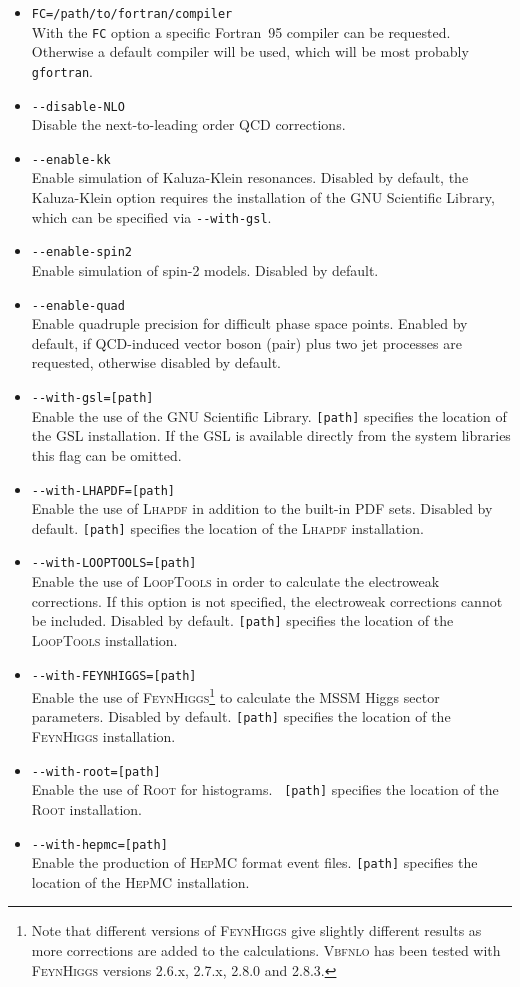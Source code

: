 \documentclass[english,12pt]{article}
\begin{document}
\begin{itemize}
\item {\tt FC=/path/to/fortran/compiler} \\ With the {\tt FC} option a specific {\sc Fortran}~95 compiler
      can be requested. Otherwise a default compiler will be used, which will be most probably {\tt gfortran}.
\item {\tt -{}-disable-NLO} \\ Disable the next-to-leading order QCD
corrections.  
\item {\tt -{}-enable-kk} \\ Enable simulation of Kaluza-Klein resonances.
Disabled by default, the Kaluza-Klein option requires the installation of the
GNU Scientific Library, which can be specified via {\tt -{}-with-gsl}. 
\item {\tt -{}-enable-spin2} \\ Enable simulation of spin-2 models.
Disabled by default. 
\item {\tt -{}-enable-quad} \\ Enable quadruple precision for difficult phase space points.
Enabled by default, if QCD-induced vector boson (pair) plus two jet processes
are requested, otherwise disabled by default.
\item {\tt -{}-with-gsl=[path]} \\ Enable the use of the GNU
Scientific Library. {\tt [path]} specifies the location of the GSL installation.
If the GSL is available directly from the system libraries this flag can be omitted.
\item {\tt -{}-with-LHAPDF=[path]} \\ Enable the use of \textsc{Lhapdf} in addition to the
built-in PDF sets.  Disabled by default. {\tt [path]} specifies the location of
the \textsc{Lhapdf} installation. 
\item {\tt -{}-with-LOOPTOOLS=[path]} \\ Enable the use of
\textsc{LoopTools} in order to calculate the electroweak corrections. 
If this option is not specified, the electroweak corrections cannot be included.
Disabled by default. {\tt [path]} specifies the location of the \textsc{LoopTools}
installation. 
\item {\tt -{}-with-FEYNHIGGS=[path]} \\ Enable the use of
\textsc{FeynHiggs}\footnote{Note that different versions of \textsc{FeynHiggs}
give slightly different results as more corrections are added to the
calculations.  \textsc{Vbfnlo} has been tested with \textsc{FeynHiggs} versions
2.6.x, 2.7.x, 2.8.0 and 2.8.3.} to calculate the MSSM Higgs sector parameters. 
Disabled by default. {\tt [path]} specifies the location of the
\textsc{FeynHiggs} installation. 
\item  {\tt -{}-with-root=[path]} \\ Enable the use of \textsc{Root} for histograms.  {\tt
[path]} specifies the location of the \textsc{Root} installation.
\item {\tt -{}-with-hepmc=[path]} \\ Enable the production of \textsc{HepMC}
format event files.  {\tt [path]} specifies the location of the \textsc{HepMC}
installation.

\end{itemize}
\end{document}
